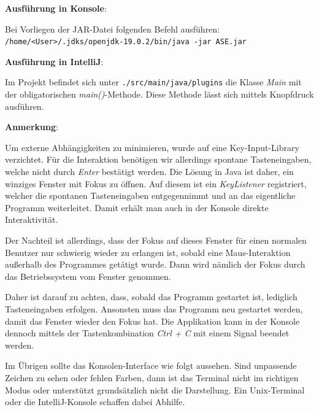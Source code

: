 \textbf{Ausführung in Konsole}:

Bei Vorliegen der JAR-Datei folgenden Befehl ausführen: \newline
\texttt{/home/<User>/.jdks/openjdk-19.0.2/bin/java -jar ASE.jar} \newline

\textbf{Ausführung in IntelliJ}:

Im Projekt befindet sich unter \texttt{./src/main/java/plugins}
die Klasse \textit{Main} mit der obligatorischen \textit{main()}-Methode.
Diese Methode lässt sich mittels Knopfdruck ausführen. \newline

\textbf{Anmerkung}:

Um externe Abhängigkeiten zu minimieren, wurde auf eine
Key-Input-Library verzichtet. Für die Interaktion benötigen wir
allerdings spontane Tasteneingaben, welche nicht durch \textit{Enter}
bestätigt werden. Die Lösung in Java ist daher, ein winziges Fenster
mit Fokus zu öffnen. Auf diesem ist ein \textit{KeyListener} registriert,
welcher die spontanen Tasteneingaben entgegennimmt und an das eigentliche
Programm weiterleitet. Damit erhält man auch in der Konsole direkte
Interaktivität.

Der Nachteil ist allerdings, dass der Fokus auf dieses Fenster für einen
normalen Benutzer nur schwierig wieder zu erlangen ist, sobald eine
Maus-Interaktion außerhalb des Programmes getätigt wurde. Dann wird
nämlich der Fokus durch das Betriebssystem vom Fenster genommen.

Daher ist darauf zu achten, dass, sobald das Programm gestartet ist,
lediglich Tasteneingaben erfolgen. Ansonsten muss das Programm
neu gestartet werden, damit das Fenster wieder den Fokus hat. Die
Applikation kann in der Konsole dennoch mittels der Tastenkombination
\textit{Ctrl + C} mit einem Signal beendet werden.

Im Übrigen sollte das Konsolen-Interface wie folgt aussehen. Sind
unpassende Zeichen zu sehen oder fehlen Farben, dann ist das Terminal
nicht im richtigen Modus oder unterstützt grundsätzlich nicht die
Darstellung. Ein Unix-Terminal oder die IntelliJ-Konsole schaffen 
dabei Abhilfe.

